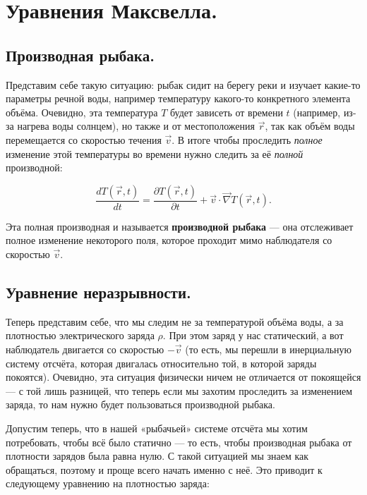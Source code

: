 \documentclass[a4paper,12pt]{article}
\newcommand{\pt}{\partial}
\newcommand{\vn}{\vec{\nabla}}
\begin{document}
\section{Уравнения Максвелла.}
\label{sec:maxwell}

\subsection{Производная рыбака.}
\label{sec:material_derivative}

Представим себе такую ситуацию: рыбак сидит на берегу реки и изучает
какие-то параметры речной воды, например температуру какого-то
конкретного элемента объёма. Очевидно, эта температура $T$ будет
зависеть от времени $t$ (например, из-за нагрева воды солнцем), но
также и от местоположения $\vec{r}$, так как объём воды перемещается
со скоростью течения $\vec{v}$. В итоге чтобы проследить
\textit{полное} изменение этой температуры во времени нужно следить за
её \textit{полной} производной: 

\begin{equation}
  \label{eq:def_material_derivative}
  \frac{d T(\vec{r},t)}{dt} = \frac{\pt T (\vec{r},t)}{\pt t} +
  \vec{v} \cdot \vn T (\vec{r},t).
\end{equation}

Эта полная производная и называется \textbf{производной рыбака} — она
отслеживает полное изменение некоторого поля, которое проходит мимо
наблюдателя со скоростью $\vec{v}$. 

\subsection{Уравнение неразрывности.}
\label{sec:cont_eq}

Теперь представим себе, что мы следим не за температурой объёма воды,
а за плотностью электрического заряда $\rho$. При этом заряд у нас
статический, а вот наблюдатель двигается со скоростью $-\vec{v}$ (то
есть, мы перешли в инерциальную систему отсчёта, которая двигалась
относительно той, в которой заряды покоятся). Очевидно, эта ситуация
физически ничем не отличается от покоящейся — с той лишь разницей, что
теперь если мы захотим проследить за изменением заряда, то нам нужно
будет пользоваться производной рыбака. 

Допустим теперь, что в нашей «рыбачьей» системе отсчёта мы хотим
потребовать, чтобы всё было статично — то есть, чтобы производная
рыбака от плотности зарядов была равна нулю. С такой ситуацией мы
знаем как обращаться, поэтому и проще всего начать именно с неё. Это
приводит к следующему уравнению на плотностью заряда: 
\end{document}
